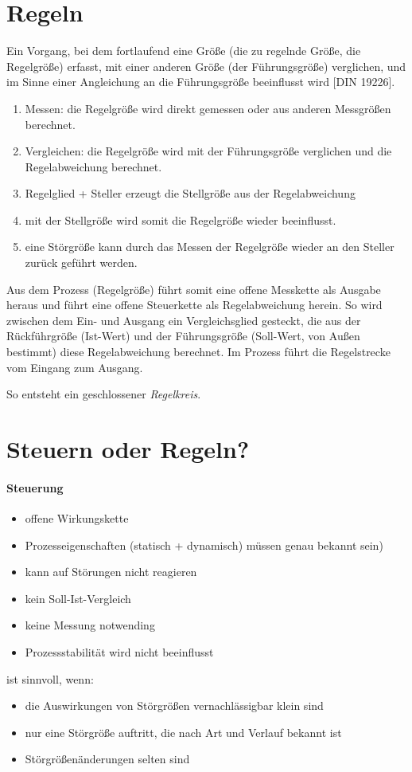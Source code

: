 \section{Regeln}
Ein Vorgang, bei dem fortlaufend eine Größe (die zu regelnde Größe, die Regelgröße) erfasst, mit einer anderen Größe (der Führungsgröße) verglichen, und im Sinne einer Angleichung an die Führungsgröße beeinflusst wird [DIN 19226].
\begin{enumerate}
\item Messen: die Regelgröße wird direkt gemessen oder aus anderen Messgrößen berechnet.
\item Vergleichen: die Regelgröße wird mit der Führungsgröße verglichen und die Regelabweichung berechnet.
\item Regelglied + Steller erzeugt die Stellgröße aus der Regelabweichung
\item[\textbullet] mit der Stellgröße wird somit die Regelgröße wieder beeinflusst.
\item[\textbullet] eine Störgröße kann durch das Messen der Regelgröße wieder an den Steller zurück geführt werden.
\end{enumerate}
Aus dem Prozess (Regelgröße) führt somit eine offene Messkette als Ausgabe heraus und führt eine offene Steuerkette als Regelabweichung herein. So wird zwischen dem Ein- und Ausgang ein Vergleichsglied gesteckt, die aus der Rückführgröße (Ist-Wert) und der Führungsgröße (Soll-Wert, von Außen bestimmt) diese Regelabweichung berechnet. Im Prozess führt die Regelstrecke vom Eingang zum Ausgang.

So entsteht ein geschlossener \emph{Regelkreis}.

\section{Steuern oder Regeln?}
\paragraph{Steuerung}
\begin{itemize}
\item offene Wirkungskette
\item Prozesseigenschaften (statisch + dynamisch) müssen genau bekannt sein)
\item kann auf Störungen nicht reagieren
\item kein Soll-Ist-Vergleich
\item keine Messung notwending
\item Prozessstabilität wird nicht beeinflusst
\end{itemize}
ist sinnvoll, wenn:
\begin{itemize}
\item die Auswirkungen von Störgrößen vernachlässigbar klein sind
\item nur eine Störgröße auftritt, die nach Art und Verlauf bekannt ist
\item Störgrößenänderungen selten sind
\end{itemize}

